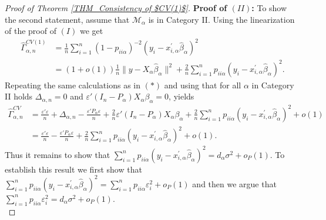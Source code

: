 \documentclass[Research_Module_ES.tex]{subfiles}
\begin{document}
\begin{proof}[Proof of Theorem \ref{THM_Consistency of $CV(1)$}]
	\textbf{Proof of $(II)$:} To show the second statement, assume that $\mathcal{M}_\alpha$ is in Category II.
	Using the linearization of the proof of $(I)$ we get
	\begin{align*}
	\hat{\Gamma}_{\alpha,n}^{CV(1)} &= \frac{1}{n}\sum_{i=1}^n (1- p_{ii\alpha})^{-2}(y_i-x_{i,\alpha}^\prime\hat{\beta}_\alpha)^2\\
	&= (1+o(1))\frac{1}{n}\lVert y-X_{\alpha}\hat{\beta}_\alpha\rVert^2 + \frac{2}{n}\sum_{i=1}^n p_{ii\alpha}(y_i-x_{i,\alpha}^\prime\hat{\beta}_\alpha)^2. 
	\end{align*}
	Repeating the same calculations as in $(\ast)$ and using that for all $\alpha$ in Category II holds $\Delta_{\alpha,n}=0$ and $\varepsilon'(I_n-P_\alpha)X_\alpha\beta_\alpha =0$, yields
	\begin{align*}
	\hat{\Gamma}_{\alpha,n}^{CV} &=\frac{\varepsilon'\varepsilon}{n} + \Delta_{\alpha,n} - \frac{\varepsilon'P_\alpha\varepsilon}{n} +\frac{2}{n}\varepsilon'(I_n-P_\alpha) X_\alpha\beta_\alpha+ \frac{2}{n}\sum_{i=1}^n p_{ii\alpha}(y_i-x_{i,\alpha}^\prime\hat{\beta}_\alpha)^2 +o(1)\\
	&= \frac{\varepsilon'\varepsilon}{n}- \frac{\varepsilon'P_\alpha\varepsilon}{n} + \frac{2}{n}\sum_{i=1}^n p_{ii\alpha}(y_i-x_{i,\alpha}^\prime\hat{\beta}_\alpha)^2 +o(1).
	\end{align*}
	Thus it remains to show that $\sum_{i=1}^n p_{ii\alpha}(y_i-x_{i,\alpha}^\prime\hat{\beta}_\alpha)^2= d_\alpha \sigma^2 + o_P(1)$.
	To establish this result we first show that $\sum_{i=1}^n p_{ii\alpha}(y_i-x_{i,\alpha}^\prime\hat{\beta}_\alpha)^2= \sum_{i=1}^n p_{ii\alpha}\varepsilon_i^2 + o_P(1)$ and then we argue that $\sum_{i=1}^n p_{ii\alpha}\varepsilon_i^2=d_\alpha\sigma^2+o_P(1)$.\\
	

\end{proof}
\end{document}
